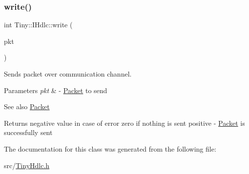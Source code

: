 \subsubsection{\texorpdfstring{write()}{write()}\hspace{0.1cm}{\footnotesize\ttfamily [2/2]}}
{\footnotesize\ttfamily int Tiny\+::\+I\+Hdlc\+::write (\begin{DoxyParamCaption}\item[{\hyperlink{classTiny_1_1IPacket}{I\+Packet} \&}]{pkt }\end{DoxyParamCaption})}

Sends packet over communication channel. 
\begin{DoxyParams}{Parameters}
{\em pkt} & -\/ \hyperlink{classTiny_1_1Packet}{Packet} to send \\
\hline
\end{DoxyParams}
\begin{DoxySeeAlso}{See also}
\hyperlink{classTiny_1_1Packet}{Packet} 
\end{DoxySeeAlso}
\begin{DoxyReturn}{Returns}
negative value in case of error zero if nothing is sent positive -\/ \hyperlink{classTiny_1_1Packet}{Packet} is successfully sent 
\end{DoxyReturn}


The documentation for this class was generated from the following file\+:\begin{DoxyCompactItemize}
\item 
src/\hyperlink{TinyHdlc_8h}{Tiny\+Hdlc.\+h}\end{DoxyCompactItemize}
